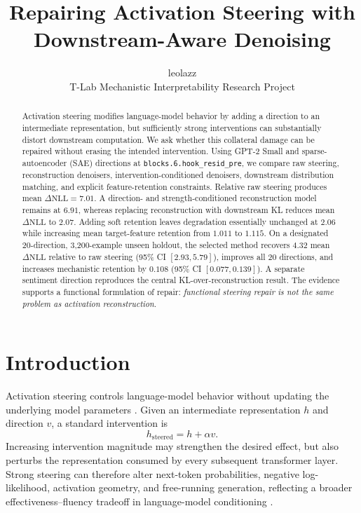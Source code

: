 \documentclass[11pt,twocolumn]{article}
\title{\vspace{-1.2em}\textbf{Repairing Activation Steering with\\Downstream-Aware Denoising}\vspace{-0.4em}}
\author{leolazz\\T-Lab Mechanistic Interpretability Research Project}
\date{}
\newcommand{\dNLL}{\Delta\mathrm{NLL}}
\begin{document}
\maketitle
\thispagestyle{fancy}

\begin{abstract}
Activation steering modifies language-model behavior by adding a direction to an intermediate representation, but sufficiently strong interventions can substantially distort downstream computation. We ask whether this collateral damage can be repaired without erasing the intended intervention. Using GPT-2 Small and sparse-autoencoder (SAE) directions at \texttt{blocks.6.hook\_resid\_pre}, we compare raw steering, reconstruction denoisers, intervention-conditioned denoisers, downstream distribution matching, and explicit feature-retention constraints. Relative raw steering produces mean $\dNLL=7.01$. A direction- and strength-conditioned reconstruction model remains at $6.91$, whereas replacing reconstruction with downstream KL reduces mean $\dNLL$ to $2.07$. Adding soft retention leaves degradation essentially unchanged at $2.06$ while increasing mean target-feature retention from $1.011$ to $1.115$. On a designated 20-direction, 3,200-example unseen holdout, the selected method recovers $4.32$ mean $\dNLL$ relative to raw steering (95\% CI $[2.93,5.79]$), improves all 20 directions, and increases mechanistic retention by $0.108$ (95\% CI $[0.077,0.139]$). A separate sentiment direction reproduces the central KL-over-reconstruction result. The evidence supports a functional formulation of repair: \emph{functional steering repair is not the same problem as activation reconstruction}.
\end{abstract}

\section{Introduction}
Activation steering controls language-model behavior without updating the underlying model parameters \citep{turner2023activation,rimsky2024caa}. Given an intermediate representation $h$ and direction $v$, a standard intervention is
\begin{equation}
  h_{\mathrm{steered}} = h + \alpha v.
\end{equation}
Increasing intervention magnitude may strengthen the desired effect, but also perturbs the representation consumed by every subsequent transformer layer. Strong steering can therefore alter next-token probabilities, negative log-likelihood, activation geometry, and free-running generation, reflecting a broader effectiveness--fluency tradeoff in language-model conditioning \citep{macocco2026tradeoff}.
\end{document}
